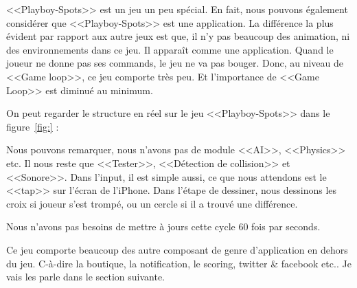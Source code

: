 <<Playboy-Spots>> est un jeu un peu spécial. En fait, nous pouvons également considérer que <<Playboy-Spots>> est une application. La différence la plus évident par rapport aux autre jeux est que, il n'y pas beaucoup des animation, ni des environnements dans ce jeu. Il apparaît comme une application. Quand le joueur ne donne pas ses commands, le jeu ne va pas bouger. Donc, au niveau de <<Game loop>>, ce jeu comporte très peu. Et l'importance de <<Game Loop>> est diminué au minimum. 

On peut regarder le structure en réel sur le jeu <<Playboy-Spots>> dans le figure~\ref{fig:} : 

Nous pouvons remarquer, nous n'avons pas de module <<AI>>, <<Physics>> etc. Il nous reste que <<Tester>>, <<Détection de collision>> et <<Sonore>>. Dans l'input, il est simple aussi, ce que nous attendons est le <<tap>> sur l'écran de l'iPhone. Dans l'étape de dessiner, nous dessinons les croix si joueur s'est trompé, ou un cercle si il a trouvé une différence.

Nous n'avons pas besoins de mettre à jours cette cycle 60 fois par seconds. 

Ce jeu comporte beaucoup des autre composant de genre d'application en dehors du jeu. C-à-dire la boutique, la notification, le scoring, twitter \& facebook etc..
Je vais les parle dans le section suivante.




